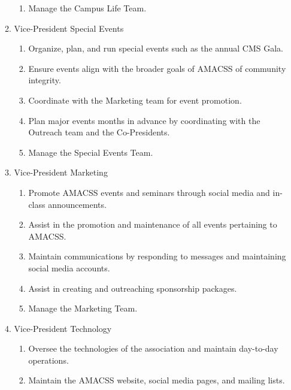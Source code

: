 \documentclass[12pt,a4paper]{article}
\begin{document}
\begin{enumerate}
\begin{enumerate}
\begin{enumerate}
\item Manage the Campus Life Team.
\end{enumerate}

\item Vice-President Special Events

\begin{enumerate}
\item Organize, plan, and run special events such as the annual CMS Gala. 

\item Ensure events align with the broader goals of AMACSS of community integrity.

\item Coordinate with the Marketing team for event promotion.

\item Plan major events months in advance by coordinating with the Outreach team and the Co-Presidents.

\item Manage the Special Events Team.
\end{enumerate}

\item Vice-President Marketing

\begin{enumerate}
\item Promote AMACSS events and seminars through social media and in-class announcements.

\item Assist in the promotion and maintenance of all events pertaining to AMACSS.

\item Maintain communications by responding to messages and maintaining social media accounts.

\item Assist in creating and outreaching sponsorship packages.

\item Manage the Marketing Team.
\end{enumerate}

\item Vice-President Technology

\begin{enumerate}
\item Oversee the technologies of the association and maintain day-to-day operations.

\item Maintain the AMACSS website, social media pages, and mailing lists.


\end{enumerate}
\end{enumerate}
\end{enumerate}
\end{document}
